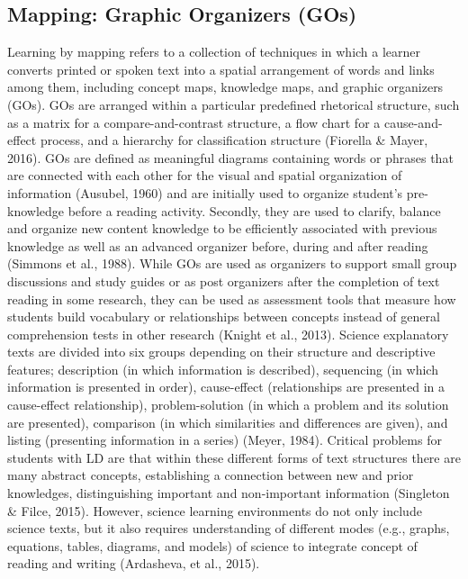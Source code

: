 \documentclass[11.5pt]{sig-alternate} %
\begin{document}
\begin{large}
\subsection*{Mapping: Graphic Organizers (GOs)}
Learning by mapping refers to a collection of techniques in which a learner converts printed or spoken text into a spatial arrangement of words and links among them, including concept maps, knowledge maps, and graphic organizers (GOs). GOs are arranged within a particular predefined rhetorical structure, such as a matrix for a compare-and-contrast structure, a flow chart for a cause-and-effect process, and a hierarchy for classification structure (Fiorella \& Mayer, 2016). GOs are defined as meaningful diagrams containing words or phrases that are connected with each other for the visual and spatial organization of information (Ausubel, 1960) and are initially used to organize student's pre-knowledge before a reading activity. Secondly, they are used to clarify, balance and organize new content knowledge to be efficiently associated with previous knowledge as well as an advanced organizer before, during and after reading (Simmons et al., 1988). While GOs are used as organizers to support small group discussions and study guides or as post organizers after the completion of text reading in some research, they can be used as assessment tools that measure how students build vocabulary or relationships between concepts instead of general comprehension tests in other research (Knight et al., 2013). Science explanatory texts are divided into six groups depending on their structure and descriptive features; description (in which information is described), sequencing (in which information is presented in order), cause-effect (relationships are presented in a cause-effect relationship), problem-solution (in which a problem and its solution are presented), comparison (in which similarities and differences are given), and listing (presenting information in a series) (Meyer, 1984). Critical problems for students with LD are that within these different forms of text structures there are many abstract concepts, establishing a connection between new and prior knowledges, distinguishing important and non-important information (Singleton \& Filce, 2015). However, science learning environments do not only include science texts, but it also requires understanding of different modes (e.g., graphs, equations, tables, diagrams, and models) of science to integrate concept of reading and writing (Ardasheva, et al., 2015).


\end{large}
\end{document}
